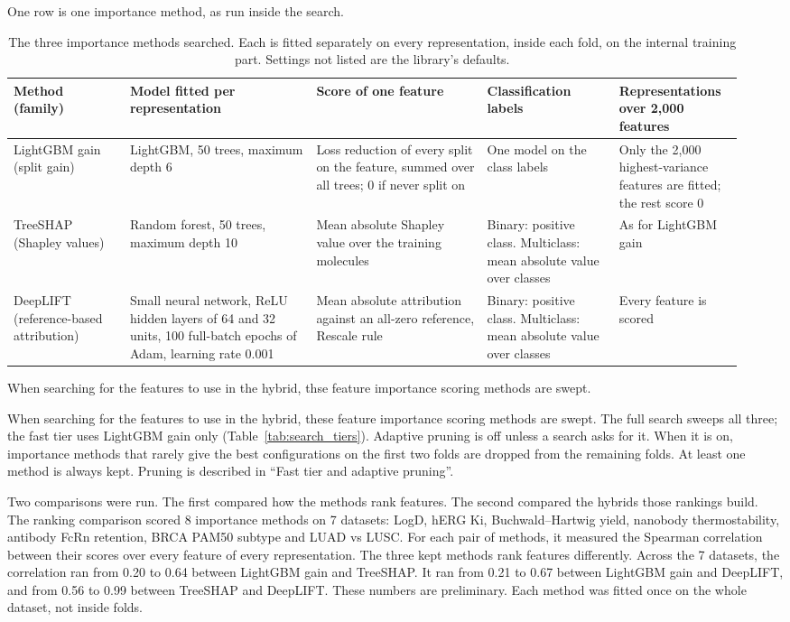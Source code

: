 One row is one importance method, as run inside the search.
\begin{table}[htbp]
\centering
\caption{The three importance methods searched. Each is fitted separately on every representation, inside each fold, on the internal training part. Settings not listed are the library's defaults.}
\label{tab:importance_methods}
\small
\begin{tabular}{@{}p{0.15\linewidth}p{0.24\linewidth}p{0.22\linewidth}p{0.17\linewidth}p{0.16\linewidth}@{}}
\toprule
Method (family) & Model fitted per representation & Score of one feature & Classification labels & Representations over 2{,}000 features \\
\midrule
LightGBM gain (split gain) & LightGBM, 50 trees, maximum depth 6 & Loss reduction of every split on the feature, summed over all trees; 0 if never split on & One model on the class labels & Only the 2{,}000 highest-variance features are fitted; the rest score 0 \\
TreeSHAP (Shapley values) & Random forest, 50 trees, maximum depth 10 & Mean absolute Shapley value over the training molecules & Binary: positive class. Multiclass: mean absolute value over classes & As for LightGBM gain \\
DeepLIFT (reference-based attribution) & Small neural network, ReLU hidden layers of 64 and 32 units, 100 full-batch epochs of Adam, learning rate 0.001 & Mean absolute attribution against an all-zero reference, Rescale rule & Binary: positive class. Multiclass: mean absolute value over classes & Every feature is scored \\
\bottomrule
\end{tabular}
\end{table}

When searching for the features to use in the hybrid, thse feature importance scoring methods are swept.

When searching for the features to use in the hybrid, these feature importance scoring methods are swept. The full search sweeps all three; the fast tier uses LightGBM gain only (Table~\ref{tab:search_tiers}). Adaptive pruning is off unless a search asks for it. When it is on, importance methods that rarely give the best configurations on the first two folds are dropped from the remaining folds. At least one method is always kept. Pruning is described in ``Fast tier and adaptive pruning''.

Two comparisons were run. The first compared how the methods rank features. The second compared the hybrids those rankings build. The ranking comparison scored 8 importance methods on 7 datasets: LogD, hERG Ki, Buchwald--Hartwig yield, nanobody thermostability, antibody FcRn retention, BRCA PAM50 subtype and LUAD vs LUSC. For each pair of methods, it measured the Spearman correlation between their scores over every feature of every representation. The three kept methods rank features differently. Across the 7 datasets, the correlation ran from 0.20 to 0.64 between LightGBM gain and TreeSHAP. It ran from 0.21 to 0.67 between LightGBM gain and DeepLIFT, and from 0.56 to 0.99 between TreeSHAP and DeepLIFT. These numbers are preliminary. Each method was fitted once on the whole dataset, not inside folds.

